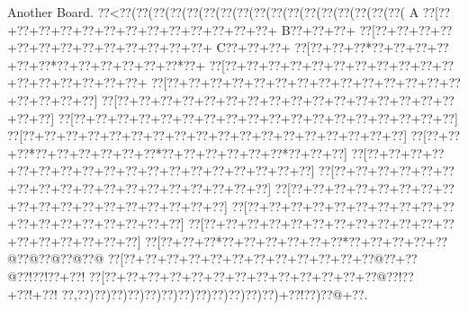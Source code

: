 \documentclass[a5paper]{article}
\begin{document}
\begin{center}
Another Board.
{\goo
\0??<\0??(\0??(\0??(\0??(\0??(\0??(\0??(\0??(\0??(\0??(\0??(\0??(\0??(\0??(\0??(\0??(\0??(\!  A
\0??[\0??+\0??+\0??+\0??+\0??+\0??+\0??+\0??+\0??+\0??+\0??+\0??+\0??+\!  B\0??+\0??+\0??+
\0??[\0??+\0??+\0??+\0??+\0??+\0??+\0??+\0??+\0??+\0??+\0??+\0??+\0??+\!  C\0??+\0??+\0??+
\0??[\0??+\0??+\0??*\0??+\0??+\0??+\0??+\0??+\0??*\0??+\0??+\0??+\0??+\0??+\0??*\0??+
\0??[\0??+\0??+\0??+\0??+\0??+\0??+\0??+\0??+\0??+\0??+\0??+\0??+\0??+\0??+\0??+\0??+\0??+
\0??[\0??+\0??+\0??+\0??+\0??+\0??+\0??+\0??+\0??+\0??+\0??+\0??+\0??+\0??+\0??+\0??+\0??+\0??]
\0??[\0??+\0??+\0??+\0??+\0??+\0??+\0??+\0??+\0??+\0??+\0??+\0??+\0??+\0??+\0??+\0??+\0??+\0??]
\0??[\0??+\0??+\0??+\0??+\0??+\0??+\0??+\0??+\0??+\0??+\0??+\0??+\0??+\0??+\0??+\0??+\0??+\0??]
\0??[\0??+\0??+\0??+\0??+\0??+\0??+\0??+\0??+\0??+\0??+\0??+\0??+\0??+\0??+\0??+\0??+\0??+\0??]
\0??[\0??+\0??+\0??*\0??+\0??+\0??+\0??+\0??+\0??*\0??+\0??+\0??+\0??+\0??+\0??*\0??+\0??+\0??]
\0??[\0??+\0??+\0??+\0??+\0??+\0??+\0??+\0??+\0??+\0??+\0??+\0??+\0??+\0??+\0??+\0??+\0??+\0??]
\0??[\0??+\0??+\0??+\0??+\0??+\0??+\0??+\0??+\0??+\0??+\0??+\0??+\0??+\0??+\0??+\0??+\0??+\0??]
\0??[\0??+\0??+\0??+\0??+\0??+\0??+\0??+\0??+\0??+\0??+\0??+\0??+\0??+\0??+\0??+\0??+\0??+\0??]
\0??[\0??+\0??+\0??+\0??+\0??+\0??+\0??+\0??+\0??+\0??+\0??+\0??+\0??+\0??+\0??+\0??+\0??+\0??]
\0??[\0??+\0??+\0??+\0??+\0??+\0??+\0??+\0??+\0??+\0??+\0??+\0??+\0??+\0??+\0??+\0??+\0??+\0??]
\0??[\0??+\0??+\0??*\0??+\0??+\0??+\0??+\0??+\0??*\0??+\0??+\0??+\0??+\0??@\0??@\0??@\0??@\0??@
\0??[\0??+\0??+\0??+\0??+\0??+\0??+\0??+\0??+\0??+\0??+\0??+\0??@\0??+\0??@\0??!\0??!\0??+\0??!
\0??[\0??+\0??+\0??+\0??+\0??+\0??+\0??+\0??+\0??+\0??+\0??+\0??+\0??@\0??!\0??+\0??!+\0??!
\0??,\0??)\0??)\0??)\0??)\0??)\0??)\0??)\0??)\0??)\0??)\0??)\0??)+\0??!\0??)\0??@+\0??.
}
\end{center}

\newpage
\end{document}
